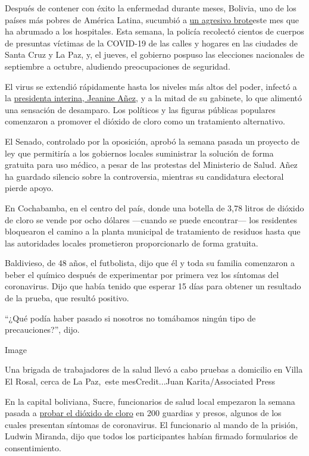 Después de contener con éxito la enfermedad durante meses, Bolivia, uno
de los países más pobres de América Latina, sucumbió a
\href{https://www.nytimes.com/2020/07/09/world/americas/bolivia-president-jeanine-anez-coronavirus.html?searchResultPosition=1}{un
agresivo brote}este mes que ha abrumado a los hospitales. Esta semana,
la policía recolectó cientos de cuerpos de presuntas víctimas de la
COVID-19 de las calles y hogares en las ciudades de Santa Cruz y La Paz,
y, el jueves, el gobierno pospuso las elecciones nacionales de
septiembre a octubre, aludiendo preocupaciones de seguridad.

El virus se extendió rápidamente hasta los niveles más altos del poder,
infectó a la
\href{https://www.nytimes.com/2020/07/09/world/americas/bolivia-president-jeanine-anez-coronavirus.html}{presidenta
interina, Jeanine Añez}, y a la mitad de su gabinete, lo que alimentó
una sensación de desamparo. Los políticos y las figuras públicas
populares comenzaron a promover el dióxido de cloro como un tratamiento
alternativo.

El Senado, controlado por la oposición, aprobó la semana pasada un
proyecto de ley que permitiría a los gobiernos locales suministrar la
solución de forma gratuita para uso médico, a pesar de las protestas del
Ministerio de Salud. Añez ha guardado silencio sobre la controversia,
mientras su candidatura electoral pierde apoyo.

En Cochabamba, en el centro del país, donde una botella de 3,78 litros
de dióxido de cloro se vende por ocho dólares ---cuando se puede
encontrar--- los residentes bloquearon el camino a la planta municipal
de tratamiento de residuos hasta que las autoridades locales prometieron
proporcionarlo de forma gratuita.

Baldivieso, de 48 años, el futbolista, dijo que él y toda su familia
comenzaron a beber el químico después de experimentar por primera vez
los síntomas del coronavirus. Dijo que había tenido que esperar 15 días
para obtener un resultado de la prueba, que resultó positivo.

``¿Qué podía haber pasado si nosotros no tomábamos ningún tipo de
precauciones?'', dijo.

Image

Una brigada de trabajadores de la salud llevó a cabo pruebas a domicilio
en Villa El Rosal, cerca de La Paz,~este mesCredit...Juan
Karita/Associated Press

En la capital boliviana, Sucre, funcionarios de salud local empezaron la
semana pasada a
\href{https://www.facebook.com/cadenaarednacional/videos/648916312499999}{probar
el dióxido de cloro} en 200 guardias y presos, algunos de los cuales
presentan síntomas de coronavirus. El funcionario al mando de la
prisión, Ludwin Miranda, dijo que todos los participantes habían firmado
formularios de consentimiento.


